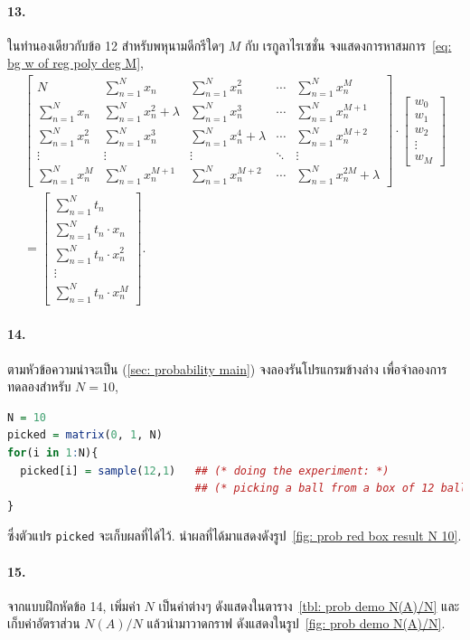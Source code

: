 \paragraph{13.} ในทำนองเดียวกับข้อ 12 สำหรับพหุนามดีกรีใดๆ $M$ กับ เรกูลาไรเซชั่น จงแสดงการหาสมการ~\ref{eq: bg w of reg poly deg M},
\begin{eqnarray}
%
\left[ 
\begin{matrix}
N & \sum_{n=1}^N x_n & \sum_{n=1}^N x_n^2 & \cdots &  \sum_{n=1}^N x_n^M \\
\sum_{n=1}^N x_n & \sum_{n=1}^N x_n^2 + \lambda & \sum_{n=1}^N x_n^3 & \cdots &  \sum_{n=1}^N x_n^{M+1} \\
\sum_{n=1}^N x_n^2 & \sum_{n=1}^N x_n^3 & \sum_{n=1}^N x_n^4  + \lambda & \cdots & \sum_{n=1}^N x_n^{M+2} \\
\vdots & \vdots & \vdots & \ddots & \vdots \\
\sum_{n=1}^N x_n^M & \sum_{n=1}^N x_n^{M+1} & \sum_{n=1}^N x_n^{M+2}  & \cdots & \sum_{n=1}^N x_n^{2M} + \lambda 
\end{matrix}
\right] \cdot 
\left[ 
\begin{matrix}
w_0 \\
w_1 \\
w_2 \\
\vdots \\
w_M
\end{matrix}
\right]
\nonumber \\
=
\left[ 
\begin{matrix}
\sum_{n=1}^N t_n \\
\sum_{n=1}^N t_n \cdot x_n \\
\sum_{n=1}^N t_n \cdot x_n^2 \\
\vdots \\
\sum_{n=1}^N t_n \cdot x_n^M
\end{matrix}
\right].
\label{eq: bg w of reg poly deg M}
\end{eqnarray}

\paragraph{14.} ตามหัวข้อความน่าจะเป็น (\textsection \ref{sec: probability main}) จงลองรันโปรแกรมข้างล่าง เพื่อจำลองการทดลองสำหรับ $N = 10$,

\begin{lstlisting}[language=R]
N = 10
picked = matrix(0, 1, N)
for(i in 1:N){
  picked[i] = sample(12,1)   ## (* doing the experiment: *)
                             ## (* picking a ball from a box of 12 balls. *)
}
\end{lstlisting}
ซึ่งตัวแปร \verb|picked| จะเก็บผลที่ได้ไว้.
นำผลที่ได้มาแสดงดังรูป~\ref{fig: prob red box result N 10}.

\paragraph{15.} จากแบบฝึกหัดข้อ 14, เพิ่มค่า $N$ เป็นค่าต่างๆ ดังแสดงในตาราง~\ref{tbl: prob demo N(A)/N} และเก็บค่าอัตราส่วน $N(A)/N$ แล้วนำมาวาดกราฟ ดังแสดงในรูป~\ref{fig: prob demo N(A)/N}.



